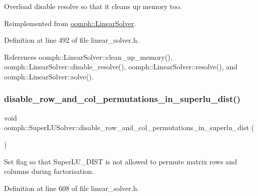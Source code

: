 Overload disable resolve so that it cleans up memory too. 



Reimplemented from \hyperlink{classoomph_1_1LinearSolver_ad61c63af94c5961830bd9807225a48d6}{oomph\+::\+Linear\+Solver}.



Definition at line 492 of file linear\+\_\+solver.\+h.



References oomph\+::\+Linear\+Solver\+::clean\+\_\+up\+\_\+memory(), oomph\+::\+Linear\+Solver\+::disable\+\_\+resolve(), oomph\+::\+Linear\+Solver\+::resolve(), and oomph\+::\+Linear\+Solver\+::solve().

\mbox{\label{classoomph_1_1SuperLUSolver_a3386eb5e27caa80d9c63a6061a304680}} 
\subsubsection{\texorpdfstring{disable\+\_\+row\+\_\+and\+\_\+col\+\_\+permutations\+\_\+in\+\_\+superlu\+\_\+dist()}{disable\_row\_and\_col\_permutations\_in\_superlu\_dist()}}
{\footnotesize\ttfamily void oomph\+::\+Super\+L\+U\+Solver\+::disable\+\_\+row\+\_\+and\+\_\+col\+\_\+permutations\+\_\+in\+\_\+superlu\+\_\+dist (\begin{DoxyParamCaption}{ }\end{DoxyParamCaption})\hspace{0.3cm}{\ttfamily [inline]}}



Set flag so that Super\+L\+U\+\_\+\+D\+I\+ST is not allowed to permute matrix rows and columns during factorisation. 



Definition at line 608 of file linear\+\_\+solver.\+h.

\mbox{\label{classoomph_1_1SuperLUSolver_aeb52340bb6d747f60fba9d6c6f9ab2e9}} 
